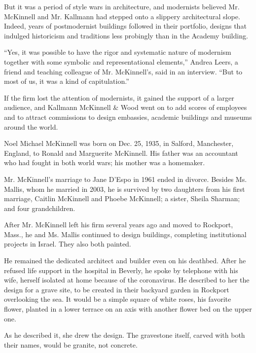 But it was a period of style wars in architecture, and modernists
believed Mr. McKinnell and Mr. Kallmann had stepped onto a slippery
architectural slope. Indeed, years of postmodernist buildings followed
in their portfolio, designs that indulged historicism and traditions
less probingly than in the Academy building.

``Yes, it was possible to have the rigor and systematic nature of
modernism together with some symbolic and representational elements,''
Andrea Leers, a friend and teaching colleague of Mr. McKinnell's, said
in an interview. ``But to most of us, it was a kind of capitulation.''

If the firm lost the attention of modernists, it gained the support of a
larger audience, and Kallmann McKinnell \& Wood went on to add scores of
employees and to attract commissions to design embassies, academic
buildings and museums around the world.

Noel Michael McKinnell was born on Dec. 25, 1935, in Salford,
Manchester, England, to Ronald and Marguerite McKinnell. His father was
an accountant who had fought in both world wars; his mother was a
homemaker.

Mr. McKinnell's marriage to Jane D'Espo in 1961 ended in divorce.
Besides Ms. Mallis, whom he married in 2003, he is survived by two
daughters from his first marriage, Caitlin McKinnell and Phoebe
McKinnell; a sister, Sheila Sharman; and four grandchildren.

After Mr. McKinnell left his firm several years ago and moved to
Rockport, Mass., he and Ms. Mallis continued to design buildings,
completing institutional projects in Israel. They also both painted.

He remained the dedicated architect and builder even on his deathbed.
After he refused life support in the hospital in Beverly, he spoke by
telephone with his wife, herself isolated at home because of the
coronavirus. He described to her the design for a grave site, to be
created in their backyard garden in Rockport overlooking the sea. It
would be a simple square of white roses, his favorite flower, planted in
a lower terrace on an axis with another flower bed on the upper one.

As he described it, she drew the design. The gravestone itself, carved
with both their names, would be granite, not concrete.

\href{https://www.nytimes3xbfgragh.onion/interactive/2020/obituaries/people-died-coronavirus-obituaries.html?action=click\&pgtype=Article\&state=default\&region=BELOW_MAIN_CONTENT\&context=covid_obits_promo}{}

